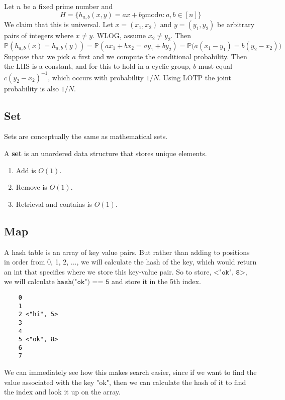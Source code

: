   \begin{example}
    Let $n$ be a fixed prime number and 
    \begin{equation}
      H = \{h_{a, b} (x, y) = ax + by \mathrm{ mod } n : a, b \in [n] \}
    \end{equation} 
    We claim that this is universal. Let $x = (x_1, x_2)$ and $y = (y_1, y_2)$ be arbitrary pairs of integers where $x \neq y$. WLOG, assume $x_2 \neq y_2$. Then 
    \begin{equation}
      \mathbb{P}(h_{a, b} (x) = h_{a, b} (y)) = \mathbb{P}(a x_1 + b x_2 = a y_1 + b y_2) = \mathbb{P}\big( a (x_1 - y_1) = b (y_2 - x_2) \big)
    \end{equation} 
    Suppose that we pick $a$ first and we compute the conditional probability. Then the LHS is a constant, and for this to hold in a cyclic group, $b$ must equal $c (y_2 - x_2)^{-1}$, which occurs with probability $1/N$. Using LOTP the joint probability is also $1/N$. 
  \end{example}

\subsection{Set} 

  Sets are conceptually the same as mathematical sets. 

  \begin{definition}[Set]
    A \textbf{set} is an unordered data structure that stores unique elements. 
    \begin{enumerate}
      \item Add is $O(1)$. 
      \item Remove is $O(1)$. 
      \item Retrieval and contains is $O(1)$. 
    \end{enumerate}
  \end{definition}

\subsection{Map} 

  A hash table is an array of key value pairs. But rather than adding to positions in order from 0, 1, 2, ..., we will calculate the hash of the key, which would return an int that specifies where we store this key-value pair. So to store, $\texttt{<"ok", 8>}$, we will calculate $\texttt{hash("ok") == 5}$ and store it in the 5th index.
  \begin{lstlisting}
    0 
    1 
    2 <"hi", 5>
    3 
    4 
    5 <"ok", 8>
    6 
    7 
  \end{lstlisting}
  We can immediately see how this makes search easier, since if we want to find the value associated with the key "ok", then we can calculate the hash of it to find the index and look it up on the array. 

